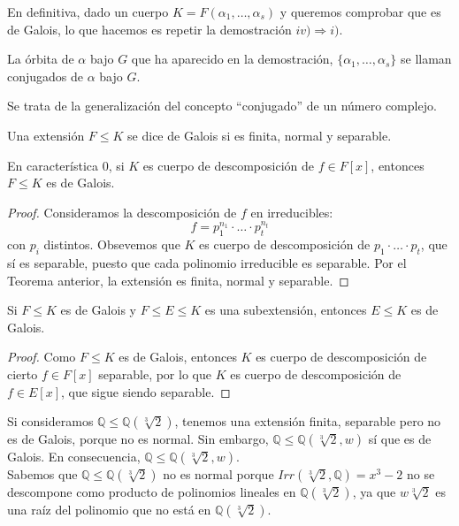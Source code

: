 En definitiva, dado un cuerpo $K = F(\alpha_1, \ldots, \alpha_s)$ y queremos comprobar que es de Galois, lo que hacemos es repetir la demostración $iv)\Longrightarrow i)$.

\begin{definicion}
    La órbita de $\alpha$ bajo $G$ que ha aparecido en la demostración, $\{\alpha_1, \ldots, \alpha_s\}$ se llaman conjugados de $\alpha$ bajo $G$.
\end{definicion}

\noindent
Se trata de la generalización del concepto ``conjugado'' de un número complejo.

\begin{definicion}
    Una extensión $F\leq K$ se dice de Galois si es finita, normal y separable.
\end{definicion}

\begin{coro}
    En característica $0$, si $K$ es cuerpo de descomposición de $f\in F[x]$, entonces $F\leq K$ es de Galois.
    \begin{proof}
        Consideramos la descomposición de $f$ en irreducibles:
        \begin{equation*}
            f = p_1^{n_1}\cdot \ldots \cdot p_t^{n_t}
        \end{equation*}
        con $p_i$ distintos. Obsevemos que $K$ es cuerpo de descomposición de $p_1\cdot \ldots\cdot p_t$, que sí es separable, puesto que cada polinomio irreducible es separable. Por el Teorema anterior, la extensión es finita, normal y separable.
    \end{proof}
\end{coro}

\begin{coro}
    Si $F\leq K$ es de Galois y $F\leq E\leq K$ es una subextensión, entonces $E\leq K$ es de Galois.
    \begin{proof}
        Como $F\leq K$ es de Galois, entonces $K$ es cuerpo de descomposición de cierto $f\in F[x]$ separable, por lo que $K$ es cuerpo de descomposición de $f\in E[x]$, que sigue siendo separable.
    \end{proof}
\end{coro}


\begin{ejemplo}
    Si consideramos $\mathbb{Q}\leq \mathbb{Q}\left(\sqrt[3]{2}\right)$, tenemos una extensión finita, separable pero no es de Galois, porque no es normal. Sin embargo, $\mathbb{Q}\leq \mathbb{Q}\left(\sqrt[3]{2},w\right)$ sí que es de Galois. En consecuencia, $\mathbb{Q}\leq \mathbb{Q}\left(\sqrt[3]{2},w\right)$.\\

    \noindent
    Sabemos que $\mathbb{Q}\leq \mathbb{Q}\left(\sqrt[3]{2}\right)$ no es normal porque $Irr\left(\sqrt[3]{2},\mathbb{Q}\right) = x^3-2$ no se descompone como producto de polinomios lineales en $\mathbb{Q}\left(\sqrt[3]{2}\right)$, ya que $w\sqrt[3]{2}$ es una raíz del polinomio que no está en $\mathbb{Q}\left(\sqrt[3]{2}\right)$.
\end{ejemplo}

